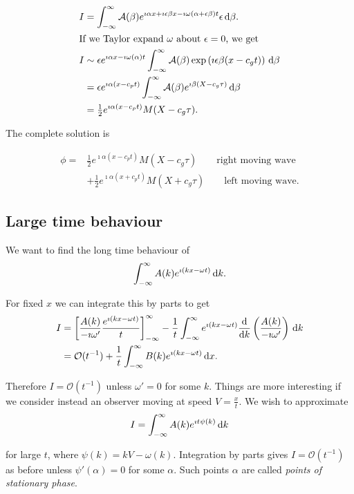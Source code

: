 \documentclass{notes}
\newcommand{\cO}{\mathcal{O}}
\begin{document}
\begin{align*}
I &= \int_{-\infty}^\infty \mathcal{A}(\beta) e^{\imath \alpha x
+ \imath \epsilon \beta x - \imath \omega(\alpha + \epsilon \beta)t}
\epsilon\, \mathrm{d} \beta. \\
\intertext{If we Taylor expand $\omega$ about $\epsilon = 0$, we get}
I &\sim \epsilon e^{\imath \alpha x - \imath \omega(\alpha) t}
\int_{-\infty}^\infty \mathcal{A}(\beta) \exp\left( \imath \epsilon \beta(
x - c_g t)\right)\, \mathrm{d} \beta \\
&= \epsilon e^{\imath \alpha (x - c_p t)}
\int_{-\infty}^\infty \mathcal{A}(\beta) e^{\imath \beta(X - c_g \tau)}\, \mathrm{d} \beta\\
&= \tfrac{1}{2} e^{\imath \alpha (x - c_p t)} M(X - c_g \tau).
\end{align*}

The complete solution is

\begin{align*}
\phi = &\tfrac{1}{2} e^{\imath \alpha (x - c_p t)}
M(X - c_g \tau) \qquad \text{right moving wave} \\
&+ \tfrac{1}{2} e^{\imath \alpha (x + c_p t)}
M(X + c_g \tau) \qquad \text{left moving wave.}
\end{align*}

\subsection{Large time behaviour}

We want to find the long time behaviour of
\[
\int_{-\infty}^\infty A(k) e^{\imath (k x - \omega t)}\, \mathrm{d} k.
\]

For fixed $x$ we can integrate this by parts to get
\begin{align*}
I &= \left[ \frac{A(k)}{-\imath \omega'} \frac{e^{\imath(k x -\omega t)}}{t}
\right]_{-\infty}^\infty -
\frac{1}{t}\int_{-\infty}^\infty e^{\imath(k x -\omega t)}
\diff{}{k} \left( \frac{A(k)}{-\imath \omega'} \right)\, \ud k \\
&= \cO(t^{-1}) + \frac{1}{t} \int_{-\infty}^\infty B(k)
e^{\imath(kx - \omega t)}\, \ud x.
\end{align*}

Therefore $I = \cO(t^{-1})$ unless $\omega' = 0$ for some $k$.  Things
are more interesting if we consider instead an observer moving at
speed $V = \tfrac{x}{t}$.  We wish to approximate
\[
I = \int_{-\infty}^\infty A(k) e^{\imath t \psi(k)}\, \mathrm{d} k
\]

for large $t$, where $\psi(k) = k V - \omega(k)$.  Integration by parts
gives $I = \cO(t^{-1})$ as before unless $\psi'(\alpha) = 0$ for
some $\alpha$.  Such points $\alpha$ are called \emph{points of stationary
phase}.
\end{document}
